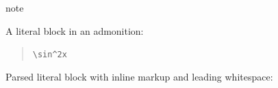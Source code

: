 \documentclass[a4paper]{article}
\begin{document}
\begin{DUclass}{note}
\begin{DUadmonition}

A literal block in an admonition:

\begin{quote}
\begin{alltt}
\textbackslash{}sin^2 x
\end{alltt}
\end{quote}
\end{DUadmonition}
\end{DUclass}


Parsed literal block with inline markup and leading whitespace:
\end{document}
